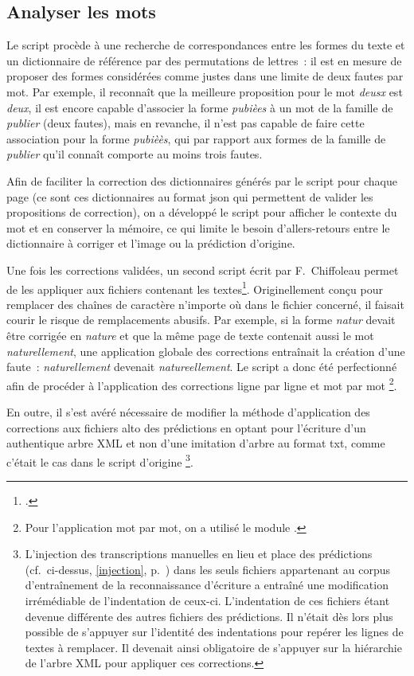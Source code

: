 \documentclass[a4paper,12pt,twoside]{book}
\begin{document}
			\subsection{Analyser les mots}
				Le script procède à une recherche de correspondances entre les formes du texte et un dictionnaire de référence par des permutations de lettres~: il est en mesure de proposer des formes considérées comme justes dans une limite de deux fautes par mot. Par exemple, il reconnaît que la meilleure proposition pour le mot \textit{deusx} est \textit{deux}, il est encore capable d'associer la forme \textit{pubièes} à un mot de la famille de \textit{publier} (deux fautes), mais en revanche, il n'est pas capable de faire cette association pour la forme \textit{pubièès}, qui par rapport aux formes de la famille de \textit{publier} qu'il connaît comporte au moins trois fautes.
						
				Afin de faciliter la correction des dictionnaires générés par le script pour chaque page (ce sont ces dictionnaires au format \gls{json} qui permettent de valider les propositions de correction), on a développé le script pour afficher le contexte du mot et en conserver la mémoire, ce qui limite le besoin d'allers-retours entre le dictionnaire à corriger et l'image ou la \gls{prédiction} d'origine.
				
				Une fois les corrections validées, un second script écrit par F.~Chiffoleau permet de les appliquer aux fichiers contenant les textes\footcite{biayTextCorrectionPy2022}. Originellement conçu pour remplacer des chaînes de caractère n'importe où dans le fichier concerné, il faisait courir le risque de remplacements abusifs. Par exemple, si la forme \textit{natur} devait être corrigée en \textit{nature} et que la même page de texte contenait aussi le mot \textit{naturellement}, une application globale des corrections entraînait la création d'une faute~: \textit{naturellement} devenait \textit{natureellement}. Le script a donc été perfectionné afin de procéder à l'application des corrections ligne par ligne et mot par mot
				\footnote{Pour l'application mot par mot, on a utilisé le module \cite{SpaCyIndustrialstrengthNatural}.}.
				
				En outre, il s'est avéré nécessaire de modifier la méthode d'application des corrections aux fichiers \gls{alto} des \glspl{prédiction} en optant pour l'écriture d'un authentique arbre XML et non d'une imitation d'arbre au format \textsf{txt}, comme c'était le cas dans le script d'origine
				\footnote{L'injection des transcriptions manuelles en lieu et place des \glspl{prédiction} (cf.~ci-dessus, \ref{injection}, p.~\pageref{injection}) dans les seuls fichiers appartenant au corpus d'entraînement de la reconnaissance d'écriture a entraîné une modification irrémédiable de l'indentation de ceux-ci. L'indentation de ces fichiers étant devenue différente des autres fichiers des \glspl{prédiction}. Il n'était dès lors plus possible de s'appuyer sur l'identité des indentations pour repérer les lignes de textes à remplacer. Il devenait ainsi obligatoire de s'appuyer sur la hiérarchie de l'arbre XML pour appliquer ces corrections.}.
\end{document}
